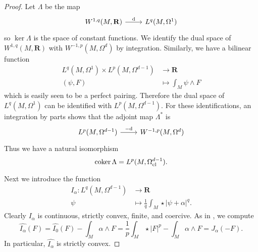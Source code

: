 \documentclass[reqno,11pt]{amsart}
\newcommand{\RR}{\mathbf{R}}
\DeclareMathOperator{\coker}{coker}
\theoremstyle{definition}
\numberwithin{equation}{section}
\begin{document}
\begin{proof}
Let $\Lambda$ be the map 
\[\begin{tikzcd}
	{W^{1, q}(M, \mathbf R)} & {L^q(M, \Omega^1)}
	\arrow["{\mathrm d}", from=1-1, to=1-2]
\end{tikzcd}\]
so $\ker \Lambda$ is the space of constant functions.
We identify the dual space of $W^{1, q}(M, \RR)$ with $W^{-1, p}(M, \Omega^d)$ by integration.
Similarly, we have a bilinear function
\begin{align*}
	L^q(M, \Omega^1) \times L^p(M, \Omega^{d - 1}) &\to \RR \\
	(\psi, F) &\mapsto \int_M \psi \wedge F
\end{align*}
which is easily seen to be a perfect pairing.
Therefore the dual space of $L^q(M, \Omega^1)$ can be identified with $L^p(M, \Omega^{d - 1})$.
For these identifications, an integration by parts shows that the adjoint map $\Lambda^*$ is
\[\begin{tikzcd}
	{L^p(M, \Omega^{d - 1})} & {W^{-1, p}(M, \Omega^d)}
	\arrow["{-\mathrm d}", from=1-1, to=1-2]
\end{tikzcd}\]
Thus we have a natural isomorphism
$$\coker \Lambda = L^p(M, \Omega^{d - 1}_{\rm cl}).$$

Next we introduce the function
\begin{align*}
I_\alpha: L^q(M, \Omega^{d - 1}) &\to \RR \\
\psi &\mapsto \frac{1}{q} \int_M \star |\psi + \alpha|^q.
\end{align*}
Clearly $I_\alpha$ is continuous, strictly convex, finite, and coercive.
As in \cite[Chapter IV, \S2.2]{Ekeland99}, we compute 
$$\widehat{I_\alpha}(F) = \widehat{I_0}(F) - \int_M \alpha \wedge F = \frac{1}{p} \int_M \star |F|^p - \int_M \alpha \wedge F = J_\alpha(-F).$$
In particular, $\widehat{I_\alpha}$ is strictly convex.


\end{proof}
\end{document}

